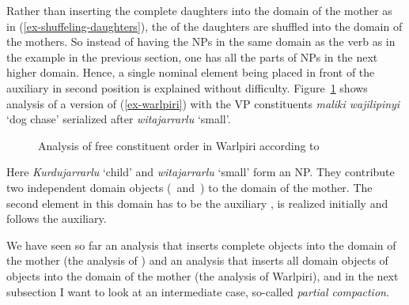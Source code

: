 \documentclass[output=paper]{langsci/langscibook}
\begin{document}
\z
Rather than inserting the complete daughters into the domain of the mother as in
(\ref{ex-shuffeling-daughters}), the \domvs of the daughters are shuffled into the domain of the
mothers. So instead of having the NPs in the same domain as the verb as in the  example in the
previous section, one has all the parts of NPs in the next higher domain. Hence, a single nominal element
being placed in front of the auxiliary in second position is explained without
difficulty. Figure~\ref{fig-warlpiri} shows  analysis of a version of
(\ref{ex-warlpiri}) with the VP constituents \emph{maliki wajilipinyi} `dog chase' serialized after \emph{witajarrarlu} `small'.
\begin{figure}
\caption{\label{fig-warlpiri}Analysis of free constituent order in Warlpiri according to \citet{DS99a}}
\end{figure}
Here \emph{Kurdujarrarlu} `child' and \emph{witajarrarlu} `small' form an NP. They contribute two independent domain objects (\,
and \,) to the domain of the mother. The second element in this domain has to be the auxiliary
,  is realized initially and  follows the auxiliary.

We have seen so far an analysis that inserts complete objects into the domain of the mother (the
analysis of ) and an analysis that inserts all domain objects of objects into the domain of the
mother (the analysis of Warlpiri), and in the next
subsection I want to look at an intermediate case, so-called \emph{partial compaction}.
\end{document}
